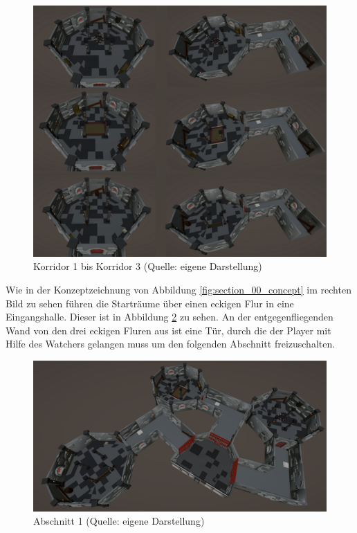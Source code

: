 \begin{figure}[ht]
\centering
\includegraphics[width=1\linewidth]{content/pictures/Room_00-Room_02-Corridor_00-Corridor_02.png}
\caption{Korridor 1 bis Korridor 3 (Quelle: eigene Darstellung)}
\label{fig:corridors}
\end{figure}

Wie in der Konzeptzeichnung von Abbildung \ref{fig:section_00_concept} im rechten Bild zu sehen führen die Starträume über einen eckigen Flur in eine Eingangshalle. Dieser ist in Abbildung \ref{fig:section_00} zu sehen. An der entgegenfliegenden Wand von den drei eckigen Fluren aus ist eine Tür, durch die der Player mit Hilfe des Watchers gelangen muss um den folgenden Abschnitt freizuschalten. 

\begin{figure}[ht]
\centering
\includegraphics[width=1\linewidth]{content/pictures/Abschnitt_00.PNG}
\caption{Abschnitt 1 (Quelle: eigene Darstellung)}
\label{fig:section_00}
\end{figure}

